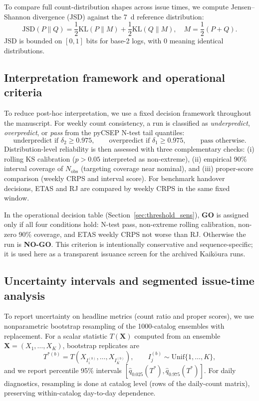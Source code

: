 \documentclass[12pt,letterpaper]{article}
\begin{document}
To compare full count-distribution shapes across issue times, we compute
Jensen--Shannon divergence (JSD) against the 7~d reference distribution:
\begin{equation}
\mathrm{JSD}(P\|Q)=\frac{1}{2}\mathrm{KL}(P\|M)+\frac{1}{2}\mathrm{KL}(Q\|M),
\quad M=\frac{1}{2}(P+Q).
\label{eq:jsd}
\end{equation}
JSD is bounded on $[0,1]$ bits for base-2 logs, with 0 meaning identical
distributions.

\subsection{Interpretation framework and operational criteria}

To reduce post-hoc interpretation, we use a fixed decision framework throughout
the manuscript. For weekly count consistency, a run is classified as
\emph{underpredict}, \emph{overpredict}, or \emph{pass} from the pyCSEP N-test
tail quantiles:
\[
\text{underpredict if }\delta_2 \ge 0.975,\qquad
\text{overpredict if }\delta_1 \ge 0.975,\qquad
\text{pass otherwise}.
\]
Distribution-level reliability is then assessed with three complementary checks:
(i) rolling KS calibration ($p>0.05$ interpreted as non-extreme),
(ii) empirical 90\% interval coverage of $N_{\mathrm{obs}}$ (targeting
coverage near nominal), and (iii) proper-score comparison (weekly CRPS and
interval score). For benchmark handover decisions, ETAS and RJ are compared by
weekly CRPS in the same fixed window.

In the operational decision table (Section~\ref{sec:threshold_sens}),
\textbf{GO} is assigned only if all four conditions hold:
N-test pass, non-extreme rolling calibration, non-zero 90\% coverage, and
ETAS weekly CRPS not worse than RJ. Otherwise the run is \textbf{NO-GO}.
This criterion is intentionally conservative and sequence-specific; it is
used here as a transparent issuance screen for the archived Kaik\={o}ura runs.

\subsection{Uncertainty intervals and segmented issue-time analysis}

To report uncertainty on headline metrics (count ratio and proper scores), we
use nonparametric bootstrap resampling of the 1000-catalog ensembles with
replacement. For a scalar statistic $T(\mathbf{X})$ computed from an ensemble
$\mathbf{X}=(X_1,\ldots,X_K)$, bootstrap replicates are
\begin{equation}
T^{*(b)} = T\!\left(X_{I^{(b)}_1},\ldots,X_{I^{(b)}_K}\right), \qquad
I^{(b)}_j \sim \mathrm{Unif}\{1,\ldots,K\},
\label{eq:bootstrap}
\end{equation}
and we report percentile 95\% intervals
$[\hat q_{0.025}(T^*), \hat q_{0.975}(T^*)]$.
For daily diagnostics, resampling is done at catalog level (rows of the
daily-count matrix), preserving within-catalog day-to-day dependence.
\end{document}
